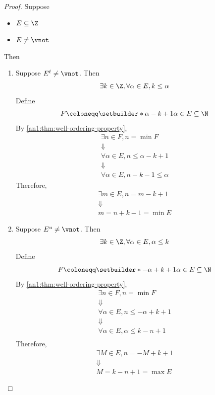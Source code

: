 \begin{proof}
  Suppose
  \begin{itemize}
    \item $E \subseteq \Z$
    \item $E \neq \vnot$
  \end{itemize}
  Then
  \begin{enumerate}[label=\textbf{(\Alph*)}]
    \item Suppose $E^{\ell} \neq \vnot$. Then
          \[
            \exists k \in \Z, \forall \alpha \in E, k \leq \alpha
          \]
          Define
          \[
            F \coloneqq \setbuilder*{\alpha - k + 1}{\alpha \in E} \subseteq \N
          \]
          By \cref{an1:thm:well-ordering-property},
          \[
            \begin{array}{c}
              \exists n \in F, n = \min F                 \\
              \Downarrow                                  \\
              \forall \alpha \in E, n \leq \alpha - k + 1 \\
              \Downarrow                                  \\
              \forall \alpha \in E, n + k - 1 \leq \alpha
            \end{array}
          \]
          Therefore,
          \[
            \begin{array}{c}
              \exists m \in E, n = m - k + 1 \\
              \Downarrow                     \\
              m = n + k - 1 = \min E
            \end{array}
          \]
    \item Suppose $E^{u} \neq \vnot$. Then
          \[
            \exists k \in \Z, \forall \alpha \in E, \alpha \leq k
          \]
          Define
          \[
            F \coloneqq \setbuilder*{- \alpha + k + 1}{\alpha \in E} \subseteq \N
          \]
          By \cref{an1:thm:well-ordering-property},
          \[
            \begin{array}{c}
              \exists n \in F, n = \min F                   \\
              \Downarrow                                    \\
              \forall \alpha \in E, n \leq - \alpha + k + 1 \\
              \Downarrow                                    \\
              \forall \alpha \in E, \alpha \leq k - n + 1   \\
            \end{array}
          \]
          Therefore,
          \[
            \begin{array}{c}
              \exists M \in E, n = - M + k + 1 \\
              \Downarrow                       \\
              M = k - n + 1 = \max E
            \end{array}
          \]
  \end{enumerate}
\end{proof}

